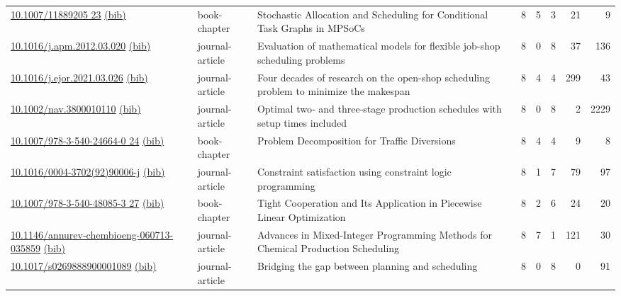 {\begin{longtable}{p{5cm}lp{11cm}rrrrr}
\href{http://dx.doi.org/10.1007/11889205_23}{10.1007/11889205 23} \href{https://www.doi2bib.org/bib/10.1007/11889205_23}{(bib)} & book-chapter & Stochastic Allocation and Scheduling for Conditional Task Graphs in MPSoCs & 8 & 5 & 3 & 21 & 9 \\
\href{http://dx.doi.org/10.1016/j.apm.2012.03.020}{10.1016/j.apm.2012.03.020} \href{https://www.doi2bib.org/bib/10.1016/j.apm.2012.03.020}{(bib)} & journal-article & Evaluation of mathematical models for flexible job-shop scheduling problems & 8 & 0 & 8 & 37 & 136 \\
\href{http://dx.doi.org/10.1016/j.ejor.2021.03.026}{10.1016/j.ejor.2021.03.026} \href{https://www.doi2bib.org/bib/10.1016/j.ejor.2021.03.026}{(bib)} & journal-article & Four decades of research on the open-shop scheduling problem to minimize the makespan & 8 & 4 & 4 & 299 & 43 \\
\href{http://dx.doi.org/10.1002/nav.3800010110}{10.1002/nav.3800010110} \href{https://www.doi2bib.org/bib/10.1002/nav.3800010110}{(bib)} & journal-article & Optimal two‐ and three‐stage production schedules with setup times included & 8 & 0 & 8 & 2 & 2229 \\
\href{http://dx.doi.org/10.1007/978-3-540-24664-0_24}{10.1007/978-3-540-24664-0 24} \href{https://www.doi2bib.org/bib/10.1007/978-3-540-24664-0_24}{(bib)} & book-chapter & Problem Decomposition for Traffic Diversions & 8 & 4 & 4 & 9 & 8 \\
\href{http://dx.doi.org/10.1016/0004-3702(92)90006-j}{10.1016/0004-3702(92)90006-j} \href{https://www.doi2bib.org/bib/10.1016/0004-3702(92)90006-j}{(bib)} & journal-article & Constraint satisfaction using constraint logic programming & 8 & 1 & 7 & 79 & 97 \\
\href{http://dx.doi.org/10.1007/978-3-540-48085-3_27}{10.1007/978-3-540-48085-3 27} \href{https://www.doi2bib.org/bib/10.1007/978-3-540-48085-3_27}{(bib)} & book-chapter & Tight Cooperation and Its Application in Piecewise Linear Optimization & 8 & 2 & 6 & 24 & 20 \\
\href{http://dx.doi.org/10.1146/annurev-chembioeng-060713-035859}{10.1146/annurev-chembioeng-060713-035859} \href{https://www.doi2bib.org/bib/10.1146/annurev-chembioeng-060713-035859}{(bib)} & journal-article & Advances in Mixed-Integer Programming Methods for Chemical Production Scheduling & 8 & 7 & 1 & 121 & 30 \\
\href{http://dx.doi.org/10.1017/s0269888900001089}{10.1017/s0269888900001089} \href{https://www.doi2bib.org/bib/10.1017/s0269888900001089}{(bib)} & journal-article & Bridging the gap between planning and scheduling & 8 & 0 & 8 & 0 & 91 \\

\end{longtable}}
